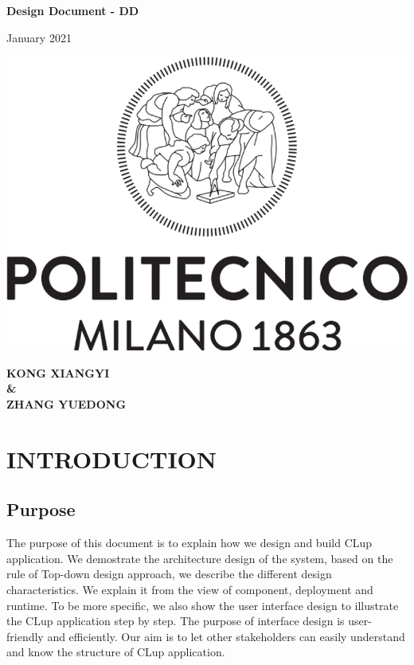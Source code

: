 \documentclass[a4paper,12pt]{report}
\begin{document}
\begin{titlepage}
	\begin{center}
		\vspace*{1cm}

		\Huge
		\textbf{Design Document - DD}

		\vspace{0.5cm}
		\large
		January 2021

		\vspace{1.5cm}


		\vfill

		\includegraphics[scale=0.7]{PolimiLogo}

		\vfill


		\normalsize
		\textbf{KONG XIANGYI} \\
		\textbf{\&} \\
		\textbf{ZHANG YUEDONG}

	\end{center}
\end{titlepage}

\tableofcontents


\chapter{INTRODUCTION}\label{ch:introduction}


\section{Purpose}
The purpose of this document is to explain how we design and build CLup application. We demostrate the architecture design of the system, based on the rule of Top-down design approach, we describe the different design characteristics. We explain it from the view of component, deployment and runtime. To be more specific, we also show the user interface design to illustrate the CLup application step by step. The purpose of interface design is user-friendly and efficiently. Our aim is to let other stakeholders can easily understand and know the structure of CLup application.
\end{document}

